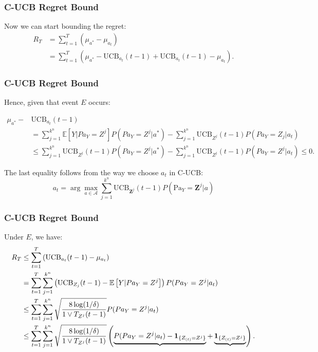 \documentclass{beamer}
\begin{document}
\begin{frame}
	\frametitle{C-UCB Regret Bound}
	Now we can start bounding the regret:
	\begin{align*}
	R_T &= \sum_{t=1}^{T}(\mu_{a^*}-\mu_{a_t})\\&= \sum_{t=1}^{T} \left(\mu_{a^*}-\text{UCB}_{a_t}(t-1)+\text{UCB}_{a_t}(t-1)-\mu_{a_t}\right).
	\end{align*}
\end{frame}


\begin{frame}
	\frametitle{C-UCB Regret Bound}
	Hence, given that event $E$ occurs:
	
	\begin{small}
		\begin{align*}
		\mu_{a^*}-&\text{UCB}_{a_t}(t-1) \\ &=\sum_{j=1}^{k^n}\mathbb{E}\left[Y|Pa_Y=Z^j\right]P(Pa_Y=Z^j|a^*)
		-\sum_{j=1}^{k^n}\text{UCB}_{Z^j}(t-1)P(Pa_Y=Z_j|a_t)\\
		&\leq \sum_{j=1}^{k^n}\text{UCB}_{Z^j}(t-1)P(Pa_Y=Z^j|a^*)
		-\sum_{j=1}^{k^n}\text{UCB}_{Z^j}(t-1)P(Pa_Y=Z^j|a_t) \leq 0.
		\end{align*}
	\end{small}
	\pause
	The last equality follows from the way we choose $a_t$ in C-UCB: 
	$$a_t = \arg\max_{a\in\mathcal{A}} \sum_{j=1}^{k^n}\text{UCB}_{\mathbf{Z}^j}(t-1)P(\text{Pa}_Y=\mathbf{Z}^j|a)$$
\end{frame}


\begin{frame}
	\frametitle{C-UCB Regret Bound}	
	Under $E$, we have:
	{\small
	\begin{align*}
	R_T &\leq \sum_{t=1}^{T}\left(\text{UCB}_{a_t}(t-1)-\mu_{a_t}\right) \notag\\
	&=\sum_{t=1}^{T}\sum_{j=1}^{k^n}\left(\text{UCB}_{Z_j}(t-1)-\mathbb{E}\left[Y|Pa_Y=Z^j\right]\right)P(Pa_Y=Z^j|a_t) \notag\\
	&\leq \sum_{t=1}^{T} \sum_{j=1}^{k^n}\sqrt{\frac{8\log(1/\delta)}{1\vee T_{Z^j}(t-1)}}P(Pa_Y=Z^j|a_t)\notag\\
	& \leq \sum_{t=1}^{T} \sum_{j=1}^{k^n}\sqrt{\frac{8\log(1/\delta)}{1\vee T_{Z^j}(t-1)}}\left(\underbrace{P(Pa_Y=Z^j|a_t)-\mathbf{1}_{\{Z_{(t)}=Z^j\}}}+\underbrace{\mathbf{1}_{\{Z_{(t)}=Z^j\}}}\right). \label{equ:UCB_azuma}
	\end{align*}
	}
\end{frame}
\end{document}
